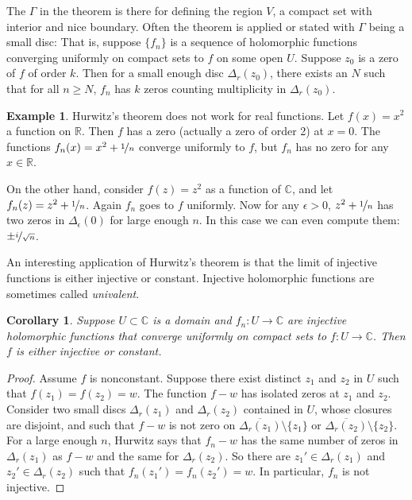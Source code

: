 \documentclass[12pt,openany]{book}
\newcommand{\C}{{\mathbb{C}}}
\newcommand{\R}{{\mathbb{R}}}
\newcommand{\myindex}[1]{#1\index{#1}}
\theoremstyle{plain}
\newtheorem{cor}[thm]{Corollary}
\theoremstyle{remark}
\theoremstyle{definition}
\theoremstyle{exercise}
\theoremstyle{example}
\newtheorem{example}[thm]{Example}
\begin{document}
The $\Gamma$ in the theorem is there for defining the region
$V$, a compact set with interior and nice boundary.
Often the theorem is applied or stated with $\Gamma$ being a small disc:
That is, suppose $\{ f_n \}$ is a sequence of holomorphic
functions converging uniformly
on compact sets to $f$ on some open $U$.  Suppose $z_0$ is a zero of
$f$ of order $k$.  Then for a small enough disc $\Delta_r(z_0)$,
there exists an $N$ such that
for all $n \geq N$, $f_n$ has $k$ zeros counting multiplicity in
$\Delta_r(z_0)$.

\begin{example}
Hurwitz's theorem does not work for real functions.  Let $f(x) =
x^2$ a function on $\R$.  Then $f$ has a zero (actually a zero of order 2)
at $x=0$.  The functions $f_n(x) = x^2+\nicefrac{1}{n}$ converge uniformly
to $f$, but $f_n$ has no zero for any $x \in \R$.

On the other hand, consider $f(z) = z^2$ as a function of $\C$, and let
$f_n(z) = z^2+\nicefrac{1}{n}$.  Again $f_n$ goes to $f$ uniformly.  Now for
any $\epsilon > 0$, $z^2+\nicefrac{1}{n}$ has
two zeros in $\Delta_\epsilon(0)$ for large enough $n$.  In this case we can even compute
them: $\pm \nicefrac{i}{\sqrt{n}}$.
\end{example}

An interesting application of Hurwitz's theorem is that the limit of
injective functions is either injective or constant.
Injective holomorphic
functions are sometimes called \emph{\myindex{univalent}}.

\begin{cor} \label{cor:univalentlimit}
Suppose $U \subset \C$ is a domain and $f_n \colon U \to \C$ are
injective holomorphic functions that converge uniformly on compact sets
to $f \colon U \to \C$.  Then $f$ is either injective or constant.
\end{cor}

\begin{proof}
Assume $f$ is nonconstant.
Suppose there exist distinct $z_1$ and $z_2$ in $U$ such that $f(z_1) =
f(z_2) = w$.  The function $f-w$ has isolated zeros at $z_1$ and $z_2$.
Consider two small discs $\Delta_r(z_1)$ and $\Delta_r(z_2)$ contained in
$U$, whose closures are disjoint,
and such that $f-w$ is not zero on
$\overline{\Delta_r(z_1)} \setminus \{ z_1 \}$ or
$\overline{\Delta_r(z_2)} \setminus \{ z_2 \}$.
For a large enough $n$, Hurwitz says that $f_n-w$ has the same number of
zeros in $\Delta_r(z_1)$ as $f-w$ and the same for $\Delta_r(z_2)$.
So there are $z_1' \in \Delta_r(z_1)$ and
$z_2' \in \Delta_r(z_2)$ such that $f_n(z_1')=f_n(z_2')=w$.
In particular, $f_n$ is not injective.
\end{proof}
\end{document}
